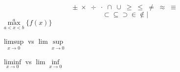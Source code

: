 \documentclass{article}
\begin{document}
	\[\pm\; \times \; \div\; \cdot\; \cap\; \cup\;
	\geq\; \leq\; \neq\; \approx \; \equiv \] 
	\[\subset \subseteq \supset  \in \notin \mid      \]
	$\max \limits_{a<x<b}^a \{f(x)\}$
	
	
	$\limsup\limits_{x\rightarrow0}$ vs $\lim\sup\limits_{x\rightarrow0}$ 
	
	$\liminf\limits_{x\rightarrow0}$ vs $\lim\inf\limits_{x\rightarrow0}$ 
\end{document}
